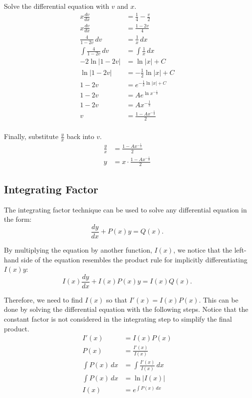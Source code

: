 \documentclass[12pt]{article}
\begin{document}
Solve the differential equation with $v$ and $x$.
\begin{align*}
	x \frac{dv}{dx}             & = \frac{1}{4} - \frac{v}{2}        \\[6pt]
	x \frac{dv}{dx}             & = \frac{1 - 2v}{4}                 \\[6pt]
	\frac{4}{1 - 2v} \, dv      & = \frac{1}{x} \, dx                \\[6pt]
	\int \frac{4}{1 - 2v} \, dv & = \int \frac{1}{x} \, dx           \\[6pt]
	-2 \ln|1 - 2v|              & = \ln|x| + C                       \\
	\ln|1 - 2v|                 & = -\frac{1}{2} \ln|x| + C          \\[6pt]
	1 - 2v                      & = e^{-\frac{1}{2} \ln|x| + C}      \\[6pt]
	1 - 2v                      & = A e^{\ln x^{-\frac{1}{2}}}       \\[6pt]
	1 - 2v                      & = A x^{-\frac{1}{2}}               \\[6pt]
	v                           & = \frac{1 - A x^{-\frac{1}{2}}}{2} \\[6pt]
\end{align*}

Finally, substitute $\frac{y}{x}$ back into $v$.
\begin{align*}
	\frac{y}{x} & = \frac{1 - A x^{-\frac{1}{2}}}{2}         \\[6pt]
	y           & = x \cdot \frac{1 - A x^{-\frac{1}{2}}}{2}
\end{align*}

\subsection{Integrating Factor}
The integrating factor technique can be used to solve any differential equation in the form:
\[ \frac{dy}{dx} + P(x)y = Q(x). \]

By multiplying the equation by another function, $I(x)$, we notice that the left-hand side of the equation resembles the product rule for implicitly differentiating $I(x) y$:
\[ I(x) \frac{dy}{dx} + I(x) P(x)y = I(x) Q(x). \]

Therefore, we need to find $I(x)$ so that $I'(x) = I(x) P(x)$. This can be done by solving the differential equation with the following steps. Notice that the constant factor is not considered in the integrating step to simplify the final product.
\begin{align*}
	I'(x)           & = I(x) P(x)                     \\
	P(x)            & = \frac{I'(x)}{I(x)}            \\[6pt]
	\int P(x) \, dx & = \int \frac{I'(x)}{I(x)} \, dx \\[6pt]
	\int P(x) \, dx & = \ln|I(x)|                     \\
	I(x)            & = e^{\int P(x) \, dx}
\end{align*}
\end{document}
